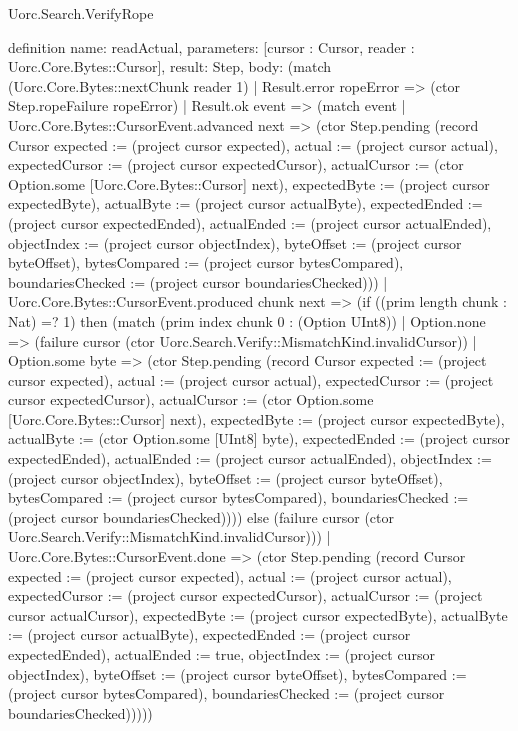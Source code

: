 \begin{lexlean}{Uorc.Search.VerifyRope}
\begin{semanticmodule}
definition{
  name: readActual,
  parameters: [cursor : Cursor, reader : Uorc.Core.Bytes::Cursor],
  result: Step,
  body: (match (Uorc.Core.Bytes::nextChunk reader 1)
    | Result.error ropeError => (ctor Step.ropeFailure ropeError)
    | Result.ok event => (match event
      | Uorc.Core.Bytes::CursorEvent.advanced next => (ctor Step.pending (record Cursor {expected := (project cursor expected), actual := (project cursor actual), expectedCursor := (project cursor expectedCursor), actualCursor := (ctor Option.some [Uorc.Core.Bytes::Cursor] next), expectedByte := (project cursor expectedByte), actualByte := (project cursor actualByte), expectedEnded := (project cursor expectedEnded), actualEnded := (project cursor actualEnded), objectIndex := (project cursor objectIndex), byteOffset := (project cursor byteOffset), bytesCompared := (project cursor bytesCompared), boundariesChecked := (project cursor boundariesChecked)}))
      | Uorc.Core.Bytes::CursorEvent.produced chunk next => (if ((prim length chunk : Nat) =? 1) then (match (prim index chunk 0 : (Option UInt8))
        | Option.none => (failure cursor (ctor Uorc.Search.Verify::MismatchKind.invalidCursor))
        | Option.some byte => (ctor Step.pending (record Cursor {expected := (project cursor expected), actual := (project cursor actual), expectedCursor := (project cursor expectedCursor), actualCursor := (ctor Option.some [Uorc.Core.Bytes::Cursor] next), expectedByte := (project cursor expectedByte), actualByte := (ctor Option.some [UInt8] byte), expectedEnded := (project cursor expectedEnded), actualEnded := (project cursor actualEnded), objectIndex := (project cursor objectIndex), byteOffset := (project cursor byteOffset), bytesCompared := (project cursor bytesCompared), boundariesChecked := (project cursor boundariesChecked)}))) else (failure cursor (ctor Uorc.Search.Verify::MismatchKind.invalidCursor)))
      | Uorc.Core.Bytes::CursorEvent.done => (ctor Step.pending (record Cursor {expected := (project cursor expected), actual := (project cursor actual), expectedCursor := (project cursor expectedCursor), actualCursor := (project cursor actualCursor), expectedByte := (project cursor expectedByte), actualByte := (project cursor actualByte), expectedEnded := (project cursor expectedEnded), actualEnded := true, objectIndex := (project cursor objectIndex), byteOffset := (project cursor byteOffset), bytesCompared := (project cursor bytesCompared), boundariesChecked := (project cursor boundariesChecked)}))))
}


\end{semanticmodule}
\end{lexlean}
